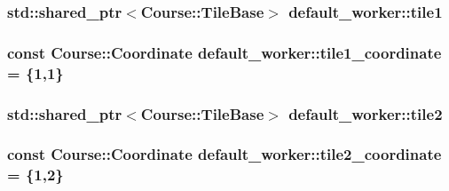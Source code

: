 \hypertarget{classdefault__worker_a1dca180451327fc342c5874f31dc5b34}{
\subsubsection[{tile1}]{\setlength{\rightskip}{0pt plus 5cm}std\-::shared\-\_\-ptr$<${\bf Course\-::\-Tile\-Base}$>$ default\-\_\-worker\-::tile1\hspace{0.3cm}{\ttfamily [private]}}}\label{classdefault__worker_a1dca180451327fc342c5874f31dc5b34}
\hypertarget{classdefault__worker_a8d151cfc7d0d347577cdb66f3db280b0}{
\subsubsection[{tile1\-\_\-coordinate}]{\setlength{\rightskip}{0pt plus 5cm}const {\bf Course\-::\-Coordinate} default\-\_\-worker\-::tile1\-\_\-coordinate = \{1,1\}\hspace{0.3cm}{\ttfamily [private]}}}\label{classdefault__worker_a8d151cfc7d0d347577cdb66f3db280b0}
\hypertarget{classdefault__worker_a58ff3b99ca13fb2bac484383cb97224e}{
\subsubsection[{tile2}]{\setlength{\rightskip}{0pt plus 5cm}std\-::shared\-\_\-ptr$<${\bf Course\-::\-Tile\-Base}$>$ default\-\_\-worker\-::tile2\hspace{0.3cm}{\ttfamily [private]}}}\label{classdefault__worker_a58ff3b99ca13fb2bac484383cb97224e}
\hypertarget{classdefault__worker_a5bbce973c2c9387484b709d57f718054}{
\subsubsection[{tile2\-\_\-coordinate}]{\setlength{\rightskip}{0pt plus 5cm}const {\bf Course\-::\-Coordinate} default\-\_\-worker\-::tile2\-\_\-coordinate = \{1,2\}\hspace{0.3cm}{\ttfamily [private]}}}\label{classdefault__worker_a5bbce973c2c9387484b709d57f718054}
